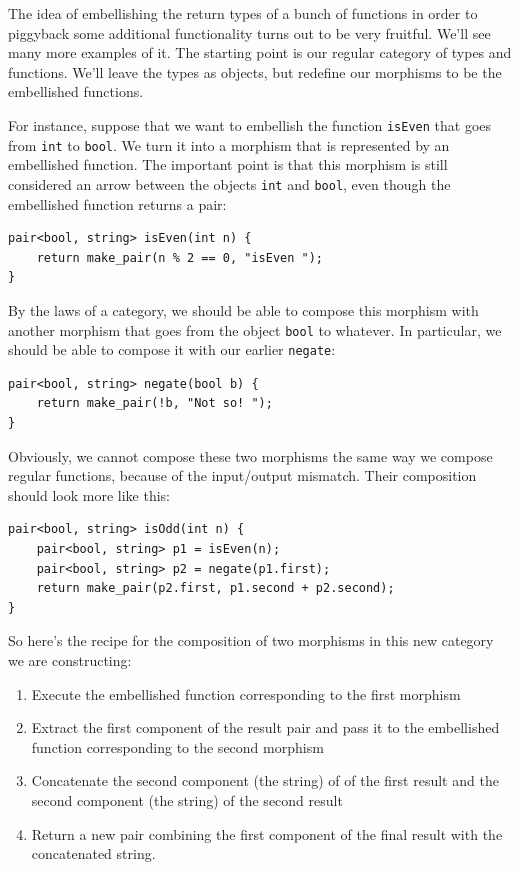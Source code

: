 The idea of embellishing the return types of a bunch of functions in
order to piggyback some additional functionality turns out to be very
fruitful. We'll see many more examples of it. The starting point is our
regular category of types and functions. We'll leave the types as
objects, but redefine our morphisms to be the embellished functions.

For instance, suppose that we want to embellish the function
\texttt{isEven} that goes from \texttt{int} to \texttt{bool}. We turn it
into a morphism that is represented by an embellished function. The
important point is that this morphism is still considered an arrow
between the objects \texttt{int} and \texttt{bool}, even though the
embellished function returns a pair:

\begin{verbatim}
pair<bool, string> isEven(int n) {
    return make_pair(n % 2 == 0, "isEven ");
}
\end{verbatim}

By the laws of a category, we should be able to compose this morphism
with another morphism that goes from the object \texttt{bool} to
whatever. In particular, we should be able to compose it with our
earlier \texttt{negate}:

\begin{verbatim}
pair<bool, string> negate(bool b) {
    return make_pair(!b, "Not so! ");
}
\end{verbatim}

Obviously, we cannot compose these two morphisms the same way we compose
regular functions, because of the input/output mismatch. Their
composition should look more like this:

\begin{verbatim}
pair<bool, string> isOdd(int n) {
    pair<bool, string> p1 = isEven(n);
    pair<bool, string> p2 = negate(p1.first);
    return make_pair(p2.first, p1.second + p2.second);
}
\end{verbatim}

So here's the recipe for the composition of two morphisms in this new
category we are constructing:

\begin{enumerate}
\tightlist
\item
  Execute the embellished function corresponding to the first morphism
\item
  Extract the first component of the result pair and pass it to the
  embellished function corresponding to the second morphism
\item
  Concatenate the second component (the string) of of the first result
  and the second component (the string) of the second result
\item
  Return a new pair combining the first component of the final result
  with the concatenated string.
\end{enumerate}

